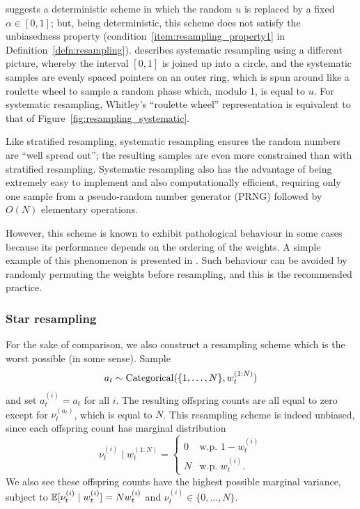 \textcite{kitagawa1996} suggests a deterministic scheme in which the random $u$ is replaced by a fixed $\alpha\in[0,1]$; but, being deterministic, this scheme does not satisfy the unbiasedness property (condition~\ref{item:resampling_property1} in Definition~\ref{defn:resampling}).
\textcite{whitley1994} describes systematic resampling using a different picture, whereby the interval $[0,1]$ is joined up into a circle, and the systematic samples are evenly spaced pointers on an outer ring, which is spun around like a roulette wheel to sample a random phase which, modulo 1, is equal to $u$.
For systematic resampling, Whitley's ``roulette wheel'' representation is equivalent to that of Figure~\ref{fig:resampling_systematic}.

Like stratified resampling, systematic resampling ensures the random numbers are ``well spread out''; the resulting samples are even more constrained than with stratified resampling. 
Systematic resampling also has the advantage of being extremely easy to implement and also computationally efficient, requiring only one sample from a pseudo-random number generator (PRNG) followed by $O(N)$ elementary operations.

However, this scheme is known to exhibit pathological behaviour in some cases because its performance depends on the ordering of the weights. A simple example of this phenomenon is presented in \textcite{douc2005}. 
Such behaviour can be avoided by randomly permuting the weights before resampling, and this is the recommended practice. 



\subsubsection{Star resampling \seb{$\checkmark$} }%
For the sake of comparison, we also construct a resampling scheme which is the worst possible (in some sense).
Sample
\begin{equation*}
a_t \sim \operatorname{Categorical}( \{1,\dots, N\}, w_t^{(1:N)} )
\end{equation*}
and set $a_t^{(i)} = a_t$ for all $i$.
The resulting offspring counts are all equal to zero except for $\nu_t^{(a_t)}$, which is equal to $N$.
This resampling scheme is indeed unbiased, since each offspring count has marginal distribution
\begin{equation*}
\nu_t^{(i)}  \mid w_t^{(1:N)} 
= \begin{cases}
0 & \text{w.p. } 1-w_t^{(i)} \\
N & \text{w.p. } w_t^{(i)} .
\end{cases}
\end{equation*}
We also see these offspring counts have the highest possible marginal variance, subject to $\mathbb{E}[ \nu_t^{(i)}  \mid w_t^{(i)} ] = Nw_t^{(i)}$ and $\nu_t^{(i)} \in \{0,\dots,N\}$.

